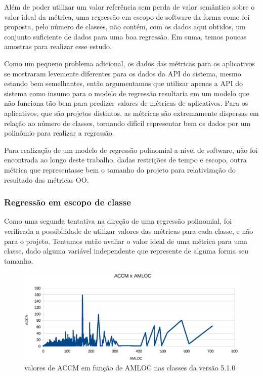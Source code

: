 Além de poder utilizar um valor referência sem perda de valor semântico sobre o valor ideal da métrica, uma regressão em escopo de software da forma como foi proposta, pelo número de classes, não contém, com os dados aqui obtidos, um conjunto suficiente de dados para uma boa regressão. Em suma, temos poucas amostras para realizar esse estudo.

Como um pequeno problema adicional, os dados das métricas para os aplicativos se mostraram levemente diferentes para os dados da API do sistema, mesmo estando bem semelhantes, então argumentamos que utilizar apenas a API do sistema como insumo para o modelo de regressão resultaria em um modelo que não funciona tão bem para predizer valores de métricas de aplicativos. Para os aplicativos, que são projetos distintos, as métricas são extremamente dispersas em relação ao número de classes, tornando difícil representar bem os dados por um polinômio para realizar a regressão. 

Para realização de um modelo de regressão polinomial a nível de software, não foi encontrada ao longo deste trabalho, dadas restrições de tempo e escopo, outra métrica que representasse bem o tamanho do projeto para relativização do resultado das métricas OO. 

\subsubsection{Regressão em escopo de classe}

Como uma segunda tentativa na direção de uma regressão polinomial, foi verificada a possibilidade de utilizar valores das métricas para cada classe, e não para o projeto. Tentamos então avaliar o valor ideal de uma métrica para uma classe, dado alguma variável independente que represente de alguma forma seu tamanho.

\begin{figure}[!htb]
\centering
\includegraphics [keepaspectratio=true,scale=0.7]{figuras/accmxamloc510.eps}
\caption{valores de ACCM em função de AMLOC nas classes da versão 5.1.0}
\label{fig:accmxamloc510}
\end{figure}

